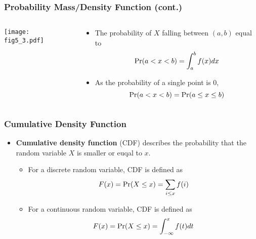 \documentclass[pdflatex, 12pt]{beamer}
\begin{document}
\begin{frame}
\frametitle{Probability Mass/Density Function (cont.)}
\begin{columns}
\begin{column}{0.5\textwidth}
\texttt{[image: fig5\_3.pdf]}
\end{column}
\begin{column}{0.5\textwidth}
\begin{itemize}
\item The probability of $X$ falling between $(a, b)$ equal to
 \begin{equation}
 \Pr(a < x < b) = \int^b_a f(x) dx \notag
 \end{equation}
\vspace{0.2cm}
\item As the probability of a single point is 0, 
 {\small
 \begin{equation}
 \Pr(a < x < b) = \Pr(a \leq x \leq b) \notag 
 \end{equation}
 }
\end{itemize}
\end{column}
\end{columns}
\end{frame}

\begin{frame}
\frametitle{Cumulative Density Function}
\begin{itemize}
\item \textbf{Cumulative density function} (CDF) describes the probability that the random variable $X$ is smaller or euqal to $x$.
 \begin{itemize}
 \item For a discrete random variable, CDF is defined as 
  \begin{equation}
  F(x) = \Pr(X \leq x) = \sum_{i \leq x} f(i) \notag
  \end{equation}
 \item For a continuous random variable, CDF is defined as 
  \begin{equation}
  F(x) = \Pr(X \leq x) = \int^x_{-\infty} f(t) dt \notag
  \end{equation}
 \end{itemize}
\end{itemize}
\end{frame}
\end{document}
